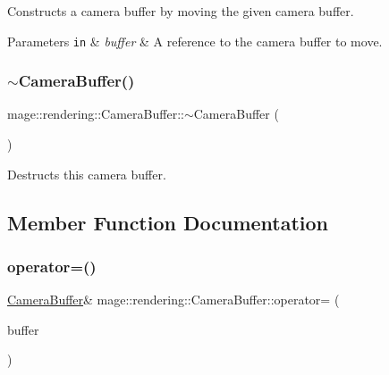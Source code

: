 Constructs a camera buffer by moving the given camera buffer.


\begin{DoxyParams}[1]{Parameters}
\mbox{\tt in}  & {\em buffer} & A reference to the camera buffer to move. \\
\hline
\end{DoxyParams}
\hypertarget{structmage_1_1rendering_1_1_camera_buffer_aadd09f0ddad88a8463e8dda3ae4e3849}{}\label{structmage_1_1rendering_1_1_camera_buffer_aadd09f0ddad88a8463e8dda3ae4e3849} 
\subsubsection{\texorpdfstring{$\sim$\+Camera\+Buffer()}{~CameraBuffer()}}
{\footnotesize\ttfamily mage\+::rendering\+::\+Camera\+Buffer\+::$\sim$\+Camera\+Buffer (\begin{DoxyParamCaption}{ }\end{DoxyParamCaption})\hspace{0.3cm}{\ttfamily [default]}}

Destructs this camera buffer. 

\subsection{Member Function Documentation}
\hypertarget{structmage_1_1rendering_1_1_camera_buffer_a5c0b3a1e054ebcb4597f313c0346da57}{}\label{structmage_1_1rendering_1_1_camera_buffer_a5c0b3a1e054ebcb4597f313c0346da57} 
\subsubsection{\texorpdfstring{operator=()}{operator=()}\hspace{0.1cm}{\footnotesize\ttfamily [1/2]}}
{\footnotesize\ttfamily \hyperlink{structmage_1_1rendering_1_1_camera_buffer}{Camera\+Buffer}\& mage\+::rendering\+::\+Camera\+Buffer\+::operator= (\begin{DoxyParamCaption}\item[{const \hyperlink{structmage_1_1rendering_1_1_camera_buffer}{Camera\+Buffer} \&}]{buffer }\end{DoxyParamCaption})\hspace{0.3cm}{\ttfamily [default]}}

